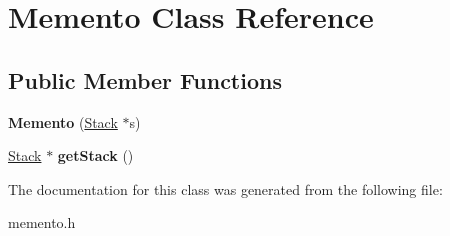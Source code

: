\hypertarget{class_memento}{}\section{Memento Class Reference}
\label{class_memento}
\subsection*{Public Member Functions}
\begin{DoxyCompactItemize}
\item 
{\bfseries Memento} (\hyperlink{class_stack}{Stack} $\ast$s)\hypertarget{class_memento_a3f27270396c420ed09ac51a4cee5d129}{}\label{class_memento_a3f27270396c420ed09ac51a4cee5d129}

\item 
\hyperlink{class_stack}{Stack} $\ast$ {\bfseries get\+Stack} ()\hypertarget{class_memento_ae9ff6624ae6da087f1e05d17c579453a}{}\label{class_memento_ae9ff6624ae6da087f1e05d17c579453a}

\end{DoxyCompactItemize}


The documentation for this class was generated from the following file\+:\begin{DoxyCompactItemize}
\item 
memento.\+h\end{DoxyCompactItemize}
